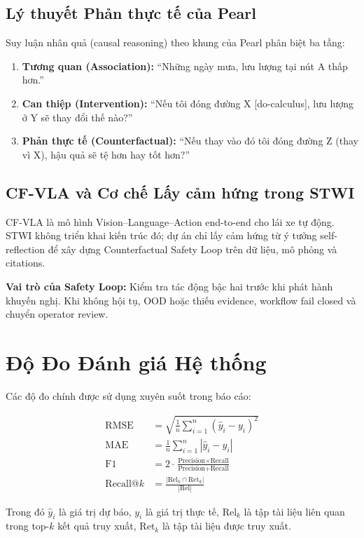 \subsection{Lý thuyết Phản thực tế của Pearl}

Suy luận nhân quả (causal reasoning) theo khung của Pearl \cite{pearl2018why} phân biệt ba tầng:

\begin{enumerate}[leftmargin=1.5cm, itemsep=4pt]
  \item \textbf{Tương quan (Association):} ``Những ngày mưa, lưu lượng tại nút A thấp hơn.''
  \item \textbf{Can thiệp (Intervention):} ``Nếu tôi đóng đường X [do-calculus], lưu lượng ở Y sẽ thay đổi thế nào?''
  \item \textbf{Phản thực tế (Counterfactual):} ``Nếu thay vào đó tôi đóng đường Z (thay vì X), hậu quả sẽ tệ hơn hay tốt hơn?''
\end{enumerate}

\subsection{CF-VLA và Cơ chế Lấy cảm hứng trong STWI}

CF-VLA là mô hình Vision--Language--Action end-to-end cho lái xe tự động. STWI không triển khai kiến trúc đó; dự án chỉ lấy cảm hứng từ ý tưởng self-reflection để xây dựng Counterfactual Safety Loop trên dữ liệu, mô phỏng và citations.

\begin{tcolorbox}[dangerbox]
\textbf{Vai trò của Safety Loop:} Kiểm tra tác động bậc hai trước khi phát hành khuyến nghị. Khi không hội tụ, OOD hoặc thiếu evidence, workflow fail closed và chuyển operator review.
\end{tcolorbox}

\section{Độ Đo Đánh giá Hệ thống}

Các độ đo chính được sử dụng xuyên suốt trong báo cáo:

\begin{align}
  \text{RMSE} &= \sqrt{\frac{1}{n}\sum_{i=1}^n (\hat{y}_i - y_i)^2} \label{eq:rmse} \\
  \text{MAE}  &= \frac{1}{n}\sum_{i=1}^n |\hat{y}_i - y_i| \label{eq:mae} \\
  \text{F1}   &= 2 \cdot \frac{\text{Precision} \times \text{Recall}}{\text{Precision} + \text{Recall}} \label{eq:f1} \\
  \text{Recall@}k &= \frac{|\text{Rel}_k \cap \text{Ret}_k|}{|\text{Rel}|} \label{eq:recall_k}
\end{align}

Trong đó $\hat{y}_i$ là giá trị dự báo, $y_i$ là giá trị thực tế, $\text{Rel}_k$ là tập tài liệu liên quan trong top-$k$ kết quả truy xuất, $\text{Ret}_k$ là tập tài liệu được truy xuất.
